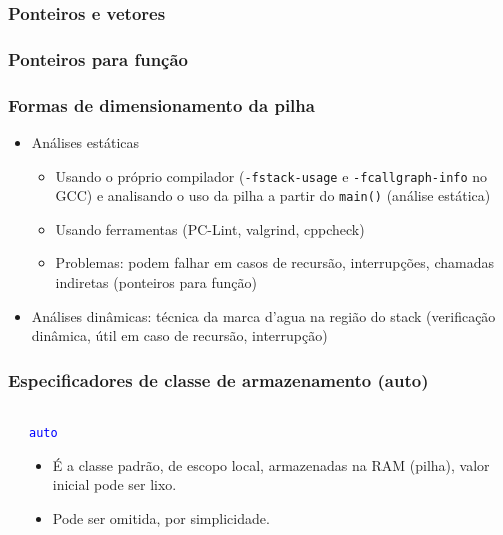 \documentclass{beamer}
\begin{document}
\begin{frame}
	\frametitle{Ponteiros e vetores}
\end{frame}

\begin{frame}
	\frametitle{Ponteiros para função}
\end{frame}

\begin{frame}
	\frametitle{Formas de dimensionamento da pilha}
	\begin{itemize}
		\item Análises estáticas
		\begin{itemize}
			\item Usando o próprio compilador (\texttt{-fstack-usage} e \texttt{-fcallgraph-info} no GCC) e analisando o uso da pilha a partir do \texttt{main()} (análise estática)
			\item Usando ferramentas (PC-Lint, valgrind, cppcheck)
			\item Problemas: podem falhar em casos de recursão, interrupções, chamadas indiretas (ponteiros para função)
		\end{itemize}
		\item Análises dinâmicas: técnica da marca d'agua na região do stack (verificação dinâmica, útil em caso de recursão, interrupção)
		\end{itemize}
\end{frame}

\begin{frame}
	\frametitle{Especificadores de classe de armazenamento (auto)}
\begin{columns}[T] %
	\begin{column}{.60\textwidth}
		
	\end{column}%
	\hfill%
	\begin{column}{.40\textwidth}
		\begin{center}
			\texttt{\textcolor{blue}{auto}}
		\end{center}
		\vspace*{0.5cm}
		\begin{itemize}
			\item É a classe padrão, de escopo local, armazenadas na RAM (pilha), valor inicial pode ser lixo.
			\item Pode ser omitida, por simplicidade.
		\end{itemize}
	\end{column}%
\end{columns}
\end{frame}
\end{document}
